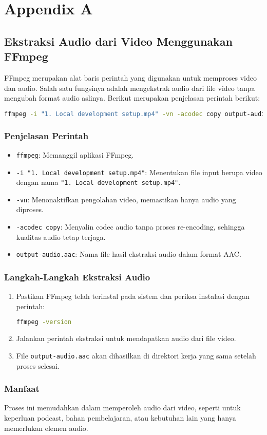 \chapter{Appendix A}


\section{Ekstraksi Audio dari Video Menggunakan FFmpeg}

FFmpeg merupakan alat baris perintah yang digunakan untuk memproses video dan audio. Salah satu fungsinya adalah mengekstrak audio dari file video tanpa mengubah format audio aslinya. Berikut merupakan penjelasan perintah berikut:

\begin{lstlisting}[language=bash]
	ffmpeg -i "1. Local development setup.mp4" -vn -acodec copy output-audio.aac
\end{lstlisting}

\subsection{Penjelasan Perintah}
\begin{itemize}
	\item \texttt{ffmpeg}: Memanggil aplikasi FFmpeg.
	\item \texttt{-i "1. Local development setup.mp4"}: Menentukan file input berupa video dengan nama \texttt{"1. Local development setup.mp4"}.
	\item \texttt{-vn}: Menonaktifkan pengolahan video, memastikan hanya audio yang diproses.
	\item \texttt{-acodec copy}: Menyalin codec audio tanpa proses re-encoding, sehingga kualitas audio tetap terjaga.
	\item \texttt{output-audio.aac}: Nama file hasil ekstraksi audio dalam format AAC.
\end{itemize}

\subsection{Langkah-Langkah Ekstraksi Audio}
\begin{enumerate}
	\item Pastikan FFmpeg telah terinstal pada sistem dan periksa instalasi dengan perintah:
	\begin{lstlisting}[language=bash]
		ffmpeg -version
	\end{lstlisting}
	\item Jalankan perintah ekstraksi untuk mendapatkan audio dari file video.
	\item File \texttt{output-audio.aac} akan dihasilkan di direktori kerja yang sama setelah proses selesai.
\end{enumerate}

\subsection{Manfaat}
Proses ini memudahkan dalam memperoleh audio dari video, seperti untuk keperluan podcast, bahan pembelajaran, atau kebutuhan lain yang hanya memerlukan elemen audio.
